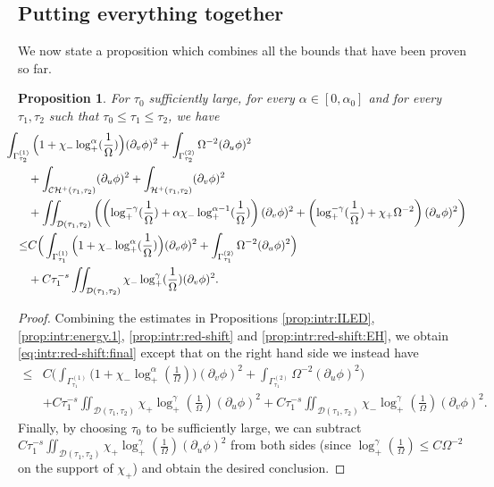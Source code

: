 \documentclass[10pt, reqno]{amsart}
\newtheorem{proposition}[theorem]{Proposition}
\theoremstyle{definition}
\theoremstyle{remark}
\numberwithin{equation}{section}
\newcommand{\rd}{\partial}
\newcommand{\bb}{\Big}
\newcommand{\0}{\emptyset}
\newcommand{\alp}{\alpha}
\newcommand{\gmm}{\gamma}
\newcommand{\Gmm}{\Gamma}
\newcommand{\Omg}{\Omega}
\newcommand{\calC}{\mathcal C}
\newcommand{\calD}{\mathcal D}
\newcommand{\calH}{\mathcal H}
\newcommand{\f}{\frac}
\newcommand{\CH}{\calC \calH^{+}}		%
\newcommand{\EH}{\calH^{+}}
\begin{document}
\subsection{Putting everything together}\label{sec.instab.together}

We now state a proposition which combines all the bounds that have been proven so far.
\begin{proposition} \label{prop:intr:red-shift:final}
For $\tau_0$ sufficiently large, for every $\alp\in [0,\alp_0]$ and for every $\tau_{1}, \tau_{2}$ such that $\tau_0 \leq \tau_{1} \leq \tau_{2}$, we have
\begin{equation} \label{eq:intr:red-shift:final}
\begin{aligned}
& \hskip-2em
	\int_{\Gmm_{\tau_{2}}^{(1)}} \bb( 1 + \chi_{-} \log_+^{\alp}(\frac{1}{\Omg}) \bb) (\rd_{v} \phi)^{2} 
	+ \int_{\Gmm_{\tau_{2}}^{(2)}} \Omg^{-2} (\rd_{u} \phi)^{2} \\
	 &+ \int_{\CH(\tau_{1}, \tau_{2})}  (\rd_{u} \phi)^{2} + \int_{\EH(\tau_{1}, \tau_{2})} (\rd_{v} \phi)^{2}  \\
	&	+ \iint_{\calD(\tau_{1}, \tau_{2})}\left(  \left( \log_+^{-\gamma}(\f{1}{\Omg}) + \alp \chi_{-} \log_+^{\alp-1}(\frac{1}{\Omg}) \right) (\rd_{v} \phi)^{2}  
		+	\left( \log_+^{-\gamma}(\f{1}{\Omg}) + \chi_{+} \Omg^{-2} \right) (\rd_{u} \phi)^{2}  \right)\\
	 \leq &C \bb( \int_{\Gmm^{(1)}_{\tau_{1}}} \bb( 1 + \chi_{-} \log_+^{\alp}(\frac{1}{\Omg}) \bb) (\rd_{v} \phi)^{2}
				+ \int_{\Gmm^{(2)}_{\tau_{1}}} \Omg^{-2} (\rd_{u} \phi)^{2} \bb)\\
			&	+C\tau_1^{-s}\iint_{\calD(\tau_{1}, \tau_{2})} \chi_-\log_+^{\gamma}(\f{1}{\Omg})(\rd_v\phi)^2.
\end{aligned}
\end{equation}
\end{proposition}
\begin{proof}
Combining the estimates in Propositions \ref{prop:intr:ILED}, \ref{prop:intr:energy.1}, \ref{prop:intr:red-shift} and \ref{prop:intr:red-shift:EH}, we obtain \eqref{eq:intr:red-shift:final} except that on the right hand side we instead have
\begin{equation*}
\begin{split}
\leq &C \bb( \int_{\Gmm^{(1)}_{\tau_{1}}} \bb( 1 + \chi_{-} \log_+^{\alp}(\frac{1}{\Omg}) \bb) (\rd_{v} \phi)^{2}
				+ \int_{\Gmm^{(2)}_{\tau_{1}}} \Omg^{-2} (\rd_{u} \phi)^{2} \bb)\\
			&	+C\tau_1^{-s}\iint_{\calD(\tau_{1}, \tau_{2})} \chi_+\log_+^{\gamma}(\f{1}{\Omg})(\rd_u\phi)^2+C\tau_1^{-s}\iint_{\calD(\tau_{1}, \tau_{2})} \chi_-\log_+^{\gamma}(\f{1}{\Omg})(\rd_v\phi)^2.
			\end{split}
			\end{equation*}
Finally, by choosing $\tau_0$ to be sufficiently large, we can subtract $C\tau_1^{-s}\iint_{\calD(\tau_{1}, \tau_{2})} \chi_+\log_+^{\gamma}(\f{1}{\Omg})(\rd_u\phi)^2$ from both sides (since $\log_{+}^{\gmm}(\frac{1}{\Omg}) \leq C \Omg^{-2}$ on the support of $\chi_{+}$) and obtain the desired conclusion.			
\end{proof}
\end{document}
